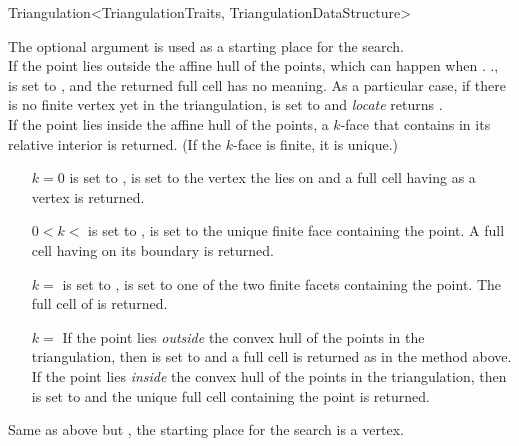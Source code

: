 \begin{ccRefClass}{Triangulation<TriangulationTraits, TriangulationDataStructure>}
{The optional argument  is used as a starting place for the
search.\\ If the  point lies outside the affine hull of the points,
which can happen when \ccVar.
\ccVar.,  is set to
, and the returned full cell has no meaning. As a
particular case, if there is no finite vertex yet in the triangulation,
 is set to  and \textit{locate} returns
.\\ If the  point lies inside the affine hull
of the points, a $k$-face that contains  {in its relative
interior} is returned. (If the $k$-face is finite, it is
unique.)\begin{itemize} \item[$k=0$]  is set to ,
 is set to the vertex  the  lies on and a full cell
having  as a vertex is returned.
\item[$0<k<$\ccc{c.current_dimension()-1}]  is set to
,  is set to the unique finite face containing the
 point. A full cell having  on its boundary is returned.
\item[$k=$\ccc{c.current_dimension()-1}]  is set to
,  is set to one of the two finite facets containing the
 point. The full cell of  is returned.
\item[$k=$\ccc{c.current_dimension()}] If the  point lies
{\em outside} the convex hull of the points in the triangulation, then
 is set to  and a full cell is returned
as in the  method above. If the  point lies
{\em inside} the convex hull of the points in the triangulation, then
 is set to  and the unique full cell containing
the  point is returned. \end{itemize}}

{Same as above but , the starting place for the search is a vertex.}



\end{ccRefClass}
